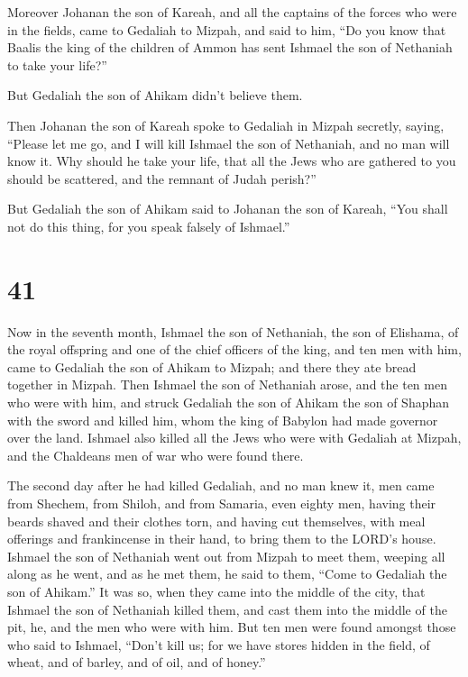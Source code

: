  Moreover Johanan the son of Kareah, and all the captains
of the forces who were in the fields, came to Gedaliah to Mizpah,
 and said to him, ``Do you know that Baalis the king of
the children of Ammon has sent Ishmael the son of Nethaniah to take your
life?''

But Gedaliah the son of Ahikam didn't believe them.

 Then Johanan the son of Kareah spoke to Gedaliah in
Mizpah secretly, saying, ``Please let me go, and I will kill Ishmael the
son of Nethaniah, and no man will know it. Why should he take your life,
that all the Jews who are gathered to you should be scattered, and the
remnant of Judah perish?''

 But Gedaliah the son of Ahikam said to Johanan the son
of Kareah, ``You shall not do this thing, for you speak falsely of
Ishmael.''

\hypertarget{section-40}{%
\section{41}\label{section-40}}

 Now in the seventh month, Ishmael the son of Nethaniah,
the son of Elishama, of the royal offspring and one of the chief
officers of the king, and ten men with him, came to Gedaliah the son of
Ahikam to Mizpah; and there they ate bread together in Mizpah.
 Then Ishmael the son of Nethaniah arose, and the ten men
who were with him, and struck Gedaliah the son of Ahikam the son of
Shaphan with the sword and killed him, whom the king of Babylon had made
governor over the land.  Ishmael also killed all the Jews
who were with Gedaliah at Mizpah, and the Chaldeans men of war who were
found there.

 The second day after he had killed Gedaliah, and no man
knew it,  men came from Shechem, from Shiloh, and from
Samaria, even eighty men, having their beards shaved and their clothes
torn, and having cut themselves, with meal offerings and frankincense in
their hand, to bring them to the LORD's house.  Ishmael
the son of Nethaniah went out from Mizpah to meet them, weeping all
along as he went, and as he met them, he said to them, ``Come to
Gedaliah the son of Ahikam.''  It was so, when they came
into the middle of the city, that Ishmael the son of Nethaniah killed
them, and cast them into the middle of the pit, he, and the men who were
with him.  But ten men were found amongst those who said
to Ishmael, ``Don't kill us; for we have stores hidden in the field, of
wheat, and of barley, and of oil, and of honey.''

